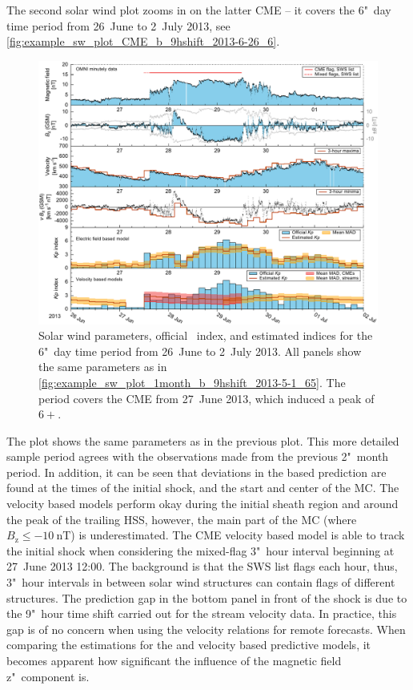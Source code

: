 The second solar wind plot zooms in on the latter CME -- it covers the 6"~day time period from 26~June to 2~July 2013, see \autoref{fig:example_sw_plot_CME_b_9hshift_2013-6-26_6}.
\begin{figure}[htb]
	\centering
	\includegraphics[width=\textwidth]{figures_of_mine/chapter2/example_sw_plot_CME_b_9hshift_2013-6-26_6.pdf}
	\caption[I created the figure myself.]
	{Solar wind parameters, official \Kp~index, and estimated \Kp{} indices for the 6"~day time period from 26~June to 2~July 2013. All panels show the same parameters as in \autoref{fig:example_sw_plot_1month_b_9hshift_2013-5-1_65}. The period covers the CME from 27~June 2013, which induced a peak \Kp{} of $6+$.}
	\label{fig:example_sw_plot_CME_b_9hshift_2013-6-26_6}
\end{figure}
The plot shows the same parameters as in the previous plot. This more detailed sample period agrees with the observations made from the previous 2"~month period. In addition, it can be seen that deviations in the \vBz{} based \Kp{} prediction are found at the times of the initial shock, and the start and center of the MC. The velocity based models perform okay during the initial sheath region and around the peak of the trailing HSS, however, the main part of the MC (where $B_\text{z} \leq \SI{-10}{\nano\tesla}$) is underestimated. The CME velocity based model is able to track the initial shock when considering the mixed-flag 3"~hour interval beginning at 27~June 2013 12:00. The background is that the SWS list flags each hour, thus, 3"~hour intervals in between solar wind structures can contain flags of different structures. The prediction gap in the bottom panel in front of the shock is due to the 9"~hour time shift carried out for the stream velocity data. In practice, this gap is of no concern when using the velocity relations for remote \Kp{} forecasts.
When comparing the \Kp{} estimations for the \vBz{} and velocity based predictive models, it becomes apparent how significant the influence of the magnetic field z"~component is.


